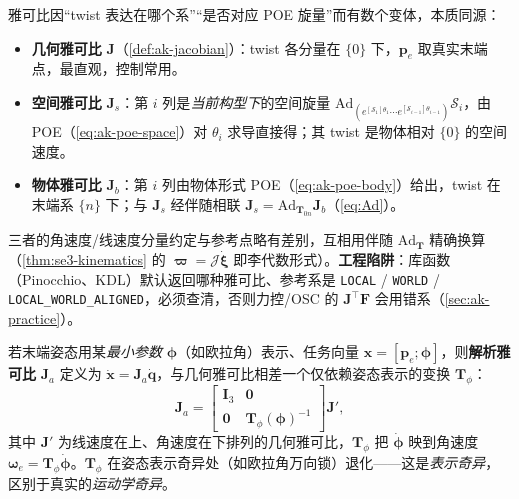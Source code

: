 \begin{note}\label{note:ak-jac-variants}
雅可比因“twist 表达在哪个系”“是否对应 POE 旋量”而有数个变体，本质同源\cite{lynch2017modern}：
\begin{itemize}
  \item \textbf{几何雅可比} $\mathbf{J}$（\cref{def:ak-jacobian}）：twist 各分量在 $\{0\}$ 下，$\mathbf{p}_e$ 取真实末端点，最直观，控制常用。
  \item \textbf{空间雅可比} $\mathbf{J}_s$：第 $i$ 列是\emph{当前构型下}的空间旋量 $\mathrm{Ad}_{(e^{[\mathcal{S}_1]\theta_1}\cdots e^{[\mathcal{S}_{i-1}]\theta_{i-1}})}\mathcal{S}_i$，由 POE（\cref{eq:ak-poe-space}）对 $\theta_i$ 求导直接得；其 twist 是物体相对 $\{0\}$ 的空间速度。
  \item \textbf{物体雅可比} $\mathbf{J}_b$：第 $i$ 列由物体形式 POE（\cref{eq:ak-poe-body}）给出，twist 在末端系 $\{n\}$ 下；与 $\mathbf{J}_s$ 经伴随相联 $\mathbf{J}_s=\mathrm{Ad}_{\mathbf{T}_{0n}}\mathbf{J}_b$（\cref{eq:Ad}）。
\end{itemize}
三者的角速度/线速度分量约定与参考点略有差别，互相用伴随 $\mathrm{Ad}_{\mathbf{T}}$ 精确换算（\cref{thm:se3-kinematics} 的 $\boldsymbol{\varpi}=\boldsymbol{\mathcal{J}}\dot{\boldsymbol{\xi}}$ 即李代数形式）。\textbf{工程陷阱}：库函数（Pinocchio、KDL）默认返回哪种雅可比、参考系是 \texttt{LOCAL} / \texttt{WORLD} / \texttt{LOCAL\_WORLD\_ALIGNED}，必须查清，否则力控/OSC 的 $\mathbf{J}^\top\mathbf{F}$ 会用错系（\cref{sec:ak-practice}）。
\end{note}

\begin{theorem}[解析雅可比]\label{thm:ak-jac-analytic}
若末端姿态用某\emph{最小参数} $\boldsymbol{\phi}$（如欧拉角）表示、任务向量 $\mathbf{x}=[\mathbf{p}_e;\boldsymbol{\phi}]$，则\textbf{解析雅可比} $\mathbf{J}_a$ 定义为 $\dot{\mathbf{x}}=\mathbf{J}_a\dot{\mathbf{q}}$，与几何雅可比相差一个仅依赖姿态表示的变换 $\mathbf{T}_\phi$\cite{spong2006robot}：
\begin{equation}
  \mathbf{J}_a=\begin{bmatrix}\mathbf{I}_3 & \mathbf{0}\\ \mathbf{0} & \mathbf{T}_\phi(\boldsymbol{\phi})^{-1}\end{bmatrix}\mathbf{J}',
  \label{eq:ak-jac-analytic}
\end{equation}
其中 $\mathbf{J}'$ 为线速度在上、角速度在下排列的几何雅可比，$\mathbf{T}_\phi$ 把 $\dot{\boldsymbol{\phi}}$ 映到角速度 $\boldsymbol{\omega}_e=\mathbf{T}_\phi\dot{\boldsymbol{\phi}}$。$\mathbf{T}_\phi$ 在姿态表示奇异处（如欧拉角万向锁）退化——这是\emph{表示奇异}，区别于真实的\emph{运动学奇异}。
\end{theorem}

